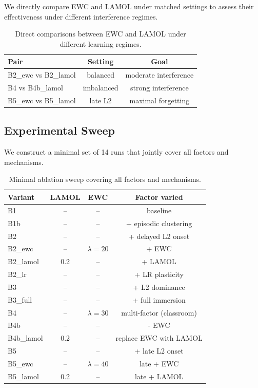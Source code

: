 We directly compare EWC and LAMOL under matched settings
to assess their effectiveness under different interference regimes.

\begin{table}[h]
\centering
\begin{tabular}{lcc}
\hline
\textbf{Pair} & \textbf{Setting} & \textbf{Goal} \\
\hline
B2\_ewc vs B2\_lamol & balanced & moderate interference \\
B4 vs B4b\_lamol & imbalanced & strong interference \\
B5\_ewc vs B5\_lamol & late L2 & maximal forgetting \\
\hline
\end{tabular}
\caption{Direct comparisons between EWC and LAMOL under
different learning regimes.}
\label{tab:mechanisms}
\end{table}

\subsection{Experimental Sweep}

We construct a minimal set of 14 runs that jointly cover
all factors and mechanisms.

\begin{table}[t]
\centering
\begin{tabular}{lccc}
\hline
\textbf{Variant} & \textbf{LAMOL} & \textbf{EWC} & \textbf{Factor varied} \\
\hline
B1 & -- & -- & baseline \\
B1b & -- & -- & + episodic clustering \\
B2 & -- & -- & + delayed L2 onset \\
B2\_ewc & -- & $\lambda=20$ & + EWC \\
B2\_lamol & 0.2 & -- & + LAMOL \\
B2\_lr & -- & -- & + LR plasticity \\
B3 & -- & -- & + L2 dominance \\
B3\_full & -- & -- & + full immersion \\
B4 & -- & $\lambda=30$ & multi-factor (classroom) \\
B4b & -- & -- & - EWC \\
B4b\_lamol & 0.2 & -- & replace EWC with LAMOL \\
B5 & -- & -- & + late L2 onset \\
B5\_ewc & -- & $\lambda=40$ & late + EWC \\
B5\_lamol & 0.2 & -- & late + LAMOL \\
\hline
\end{tabular}
\caption{Minimal ablation sweep covering all factors and mechanisms.}
\label{tab:sweep}
\end{table}



